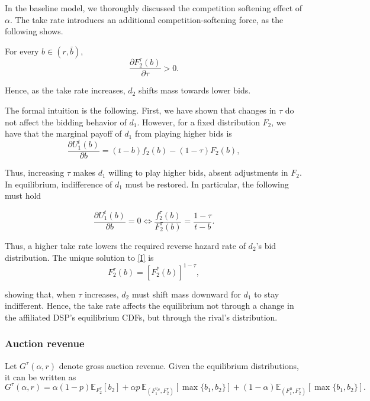 \noindent In the baseline model, we thoroughly discussed the competition softening effect of $ \alpha $. The take rate introduces an additional competition-softening force, as the following shows.

\begin{cor}
For every $b\in(r,\bar b)$,
\[
\frac{\partial F_2^\tau(b)}{\partial \tau}>0.
\]

\noindent Hence, as the take rate increases, $ d_2 $ shifts mass towards lower bids.
\end{cor}

\noindent The formal intuition is the following. First, we have shown that changes in $ \tau $ do not affect the bidding behavior of $ d_1 $. However, for a fixed distribution $ F_2 $, we have that the marginal payoff of $ d_1 $ from playing higher bids is
\[
\frac{\partial U_1^t(b)}{\partial b}
=
(t-b)f_2(b)-(1-\tau)F_2(b),
\]

\noindent Thus, increasing $ \tau $ makes $ d_1 $ willing to play higher bids, absent adjustments in $ F_2 $. In equilibrium, indifference of $ d_1 $ must be restored. In particular, the following must hold

\begin{equation}\tag{I$\tau$}\label{I}
\frac{\partial U_1^t(b)}{\partial b}
= 0
\iff
\frac{f_2^\tau(b)}{F_2^\tau(b)}
=
\frac{1-\tau}{t-b}.
\end{equation}

\noindent Thus, a higher take rate lowers the required reverse hazard rate of $ d_2 $'s bid distribution. The unique solution to \eqref{I} is
\[
F_2^\tau(b)=\left[F_2^*(b)\right]^{1-\tau},
\]

\noindent showing that, when $ \tau $ increases, $ d_2 $ must shift mass downward for $ d_1 $ to stay indifferent. Hence, the take rate affects the equilibrium not through a change in the affiliated DSP's equilibrium CDFs, but through the rival's distribution.

\subsubsection{Auction revenue}

Let $ G^\tau(\alpha,r) $ denote gross auction revenue. Given the equilibrium distributions, it can be written as
\[
G^\tau(\alpha,r)
=
\alpha(1-p)\mathbb E_{F_2^\tau}[b_2]
+
\alpha p\,\mathbb E_{\left( F_1^{v_H},F_2^\tau \right)}
\left[
\max\{b_1,b_2\}
\right]
+
(1-\alpha)\mathbb E_{\left( F_1^{\mu},F_2^\tau \right)}
\left[
\max\{b_1,b_2\}
\right].
\]

